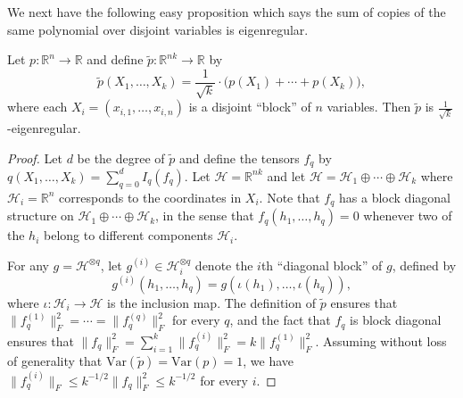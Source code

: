 \documentclass{toc}
\newcommand{\Var}{\mathrm{Var}}
\begin{document}
We next have the following easy proposition which says the sum of copies of the same polynomial over disjoint variables is eigenregular. 
\begin{fact}\label{fact:eigen-2}
Let $p: \mathbb{R}^{n} \rightarrow \mathbb{R}$ and define $\tilde p : \mathbb{R}^{n k} \rightarrow \mathbb{R}$ by
$$
\tilde p(X_1, \ldots, X_k) = \frac{1}{\sqrt{k}} \cdot \big( p(X_1) + \cdots + p(X_k)), 
$$
where each $X_i = (x_{i,1}, \dots, x_{i,n})$ is a disjoint ``block'' of $n$ variables. Then $\tilde p$ is $\frac{1}{\sqrt{k}}$-eigenregular. 
\end{fact}
\begin{proof}
Let $d$ be the degree of $\tilde p$ and define the tensors $f_q$ by $q(X_1, \ldots, X_k) =  \sum_{q=0}^{d}I_q(f_q)$.
Let $\mathcal{H} = \mathbb{R}^{n k}$ and let $\mathcal{H} = \mathcal{H}_1
\oplus \cdots \oplus \mathcal{H}_k$ where $\mathcal{H}_i = \mathbb{R}^n$
corresponds to the coordinates in $X_i$. Note that $f_q$ has a block diagonal
structure on $\mathcal{H}_1 \oplus \cdots \oplus \mathcal{H}_k$, in the sense that
$f_q(h_1, \dots, h_q) = 0$ whenever two of the $h_i$ belong to different components $\mathcal{H}_i$.

For any $g = \mathcal{H}^{\otimes q}$, let $g^{(i)} \in \mathcal{H}_i^{\otimes q}$ denote the $i$th ``diagonal block''
of $g$, defined by
\[
    g^{(i)}(h_1, \dots, h_q) = g(\iota(h_1), \dots, \iota(h_q)),
\]
where $\iota: \mathcal{H}_i \to \mathcal{H}$ is the inclusion map.
The definition of $\tilde p$ ensures that $\|f_q^{(1)}\|_F^2 = \cdots = \|f_q^{(q)}\|_F^2$
for every $q$, and the fact that $f_q$ is block diagonal ensures that
$\|f_q\|_F^2 = \sum_{i=1}^k \|f_q^{(i)}\|_F^2 = k \|f_q^{(1)}\|_F^2$.
Assuming without loss of generality that $\Var(\tilde p) = \Var(p) = 1$,
we have $\|f_q^{(i)}\|_F \le k^{-1/2} \|f_q\|_F^2 \le k^{-1/2}$ for every $i$.



\end{proof}
\end{document}
